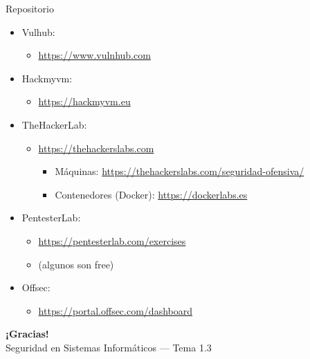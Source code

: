 \documentclass[aspectratio=169,11pt]{beamer}
\begin{document}
\begin{frame}[allowframebreaks]{Repositorio}
\small
  \begin{itemize}
  \item Vulhub:
    \begin{itemize}
    \item \href{https://www.vulnhub.com/}{https://www.vulnhub.com}
    \end{itemize}
  \item Hackmyvm:
    \begin{itemize}
    \item \href{https://hackmyvm.eu/}{https://hackmyvm.eu}
    \end{itemize}
  \item TheHackerLab:
    \begin{itemize}
    \item \href{https://thehackerslabs.com/}{https://thehackerslabs.com}
      \begin{itemize}
      \item Máquinas: \href{https://thehackerslabs.com/seguridad-ofensiva/}{https://thehackerslabs.com/seguridad-ofensiva/}
      \item Contenedores (Docker): \href{https://dockerlabs.es/}{https://dockerlabs.es}
      \end{itemize}
    \end{itemize}
  \item PentesterLab:
    \begin{itemize}
    \item \href{https://pentesterlab.com/exercises}{https://pentesterlab.com/exercises}
    \item (algunos son free)
    \end{itemize}
  \item Offsec:
    \begin{itemize}
    \item \href{https://portal.offsec.com/dashboard}{https://portal.offsec.com/dashboard}
    \end{itemize}
  \end{itemize}
\end{frame}

\begin{frame}[plain]
  \begin{center}
    {\Huge\bfseries\color{uznavy} ¡Gracias!}\\[1em]
    {\large Seguridad en Sistemas Informáticos --- Tema 1.3}
  \end{center}
\end{frame}
\end{document}
